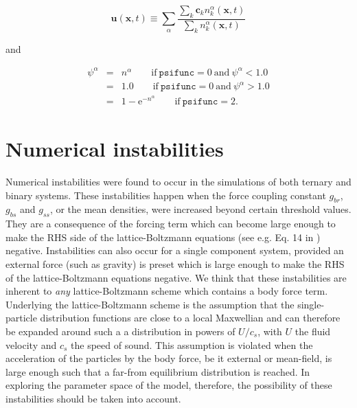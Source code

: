 \documentclass[a4paper]{article}
\begin{document}
\begin{description}
	$$
	\mathbf{u}(\mathbf{x},t)
	\equiv
	\sum_\alpha
	\frac{\sum_k \mathbf{c}_k n_k^\alpha(\mathbf{x},t)} 
	{\sum_k n_k^\alpha(\mathbf{x},t)}
	$$ 

	\noindent and   

	\begin{eqnarray}
		\psi^\alpha 
			&=& n^\alpha   \qquad\mathrm{if~} \mathtt{psifunc}=0 
				       \mathrm{~and~} \psi^\alpha < 1.0 
								\nonumber\\
	       	       	&=& 1.0	   \qquad\mathrm{if~} \mathtt{psifunc}=0 
				   \mathrm{~and~} \psi^\alpha > 1.0 
								\nonumber\\
	                &=& 1 - \mathrm{e}^{-n^\alpha}    
				   \qquad\mathrm{if~} \mathtt{psifunc}=2.
								\nonumber
	\end{eqnarray}
      \end{description}
    
\section{Numerical instabilities}
Numerical instabilities were found to occur in the simulations of both ternary
and binary systems.  These instabilities happen when the force coupling constant
$g_{br}$, $g_{bs}$ and $g_{ss}$, or the mean densities, were increased beyond
certain threshold values.  They are a consequence of the forcing term which can
become large enough to make the RHS side of the lattice-Boltzmann equations (see
e.g. Eq. 14 in \cite{bib:maziar2}) negative. Instabilities can  also occur for a
single component system, provided an external force (such as gravity) is preset
which is large enough to make the RHS of the lattice-Boltzmann equations
negative. We think that these instabilities are inherent to {\em any}
lattice-Boltzmann scheme which contains a body force term.  Underlying the
lattice-Boltzmann scheme is the assumption that the single-particle distribution
functions are close to a local Maxwellian and can therefore be expanded around
such a a distribution in powers of $U/c_s$, with $U$ the fluid velocity and
$c_s$ the speed of sound.  This assumption is violated when the acceleration of
the particles by the body force, be it external or mean-field, is large enough
such that a far-from equilibrium distribution is reached.  In exploring the
parameter space of the model, therefore, the possibility of these instabilities
should be taken into account.
\end{document}
